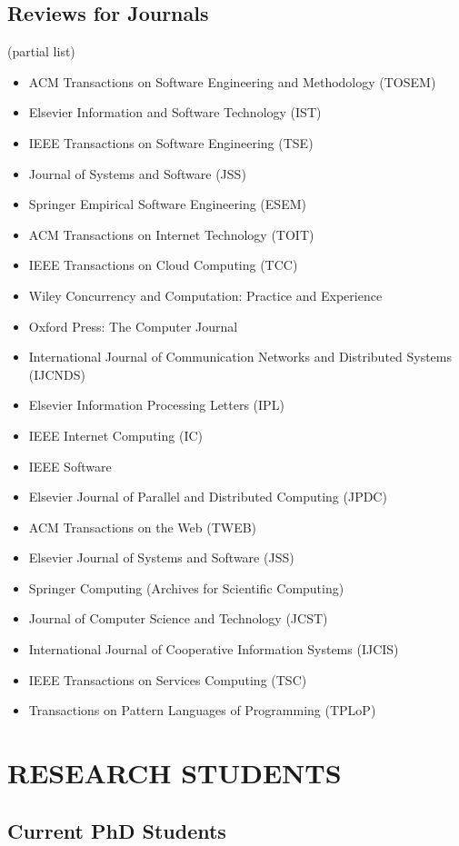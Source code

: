 \documentclass[paper=letter,fontsize=11pt]{scrartcl} %
\newcommand{\NewPart}[2]{\section*{\uppercase{#1} #2}}
\begin{document}
\subsection*{Reviews for Journals}

(partial list)

\begin{itemize}
\item ACM Transactions on Software Engineering and Methodology (TOSEM)
\item Elsevier Information and Software Technology (IST)
\item IEEE Transactions on Software Engineering (TSE)
\item Journal of Systems and Software (JSS)
\item Springer Empirical Software Engineering (ESEM)
\item ACM Transactions on Internet Technology (TOIT)
\item IEEE Transactions on Cloud Computing (TCC)
\item Wiley Concurrency and Computation: Practice and Experience
\item Oxford Press: The Computer Journal
\item International Journal of Communication Networks and Distributed Systems (IJCNDS)
\item Elsevier Information Processing Letters (IPL)
\item IEEE Internet Computing (IC)
\item IEEE Software
\item Elsevier Journal of Parallel and Distributed Computing (JPDC)
\item ACM Transactions on the Web (TWEB)
\item Elsevier Journal of Systems and Software (JSS)
\item Springer Computing (Archives for Scientific Computing)
\item Journal of Computer Science and Technology (JCST)
\item International Journal of Cooperative Information Systems (IJCIS)
\item IEEE Transactions on Services Computing (TSC)
\item Transactions on Pattern Languages of Programming (TPLoP)
\end{itemize}

\NewPart{Research Students}{}

\subsection*{Current PhD Students}
\end{document}
